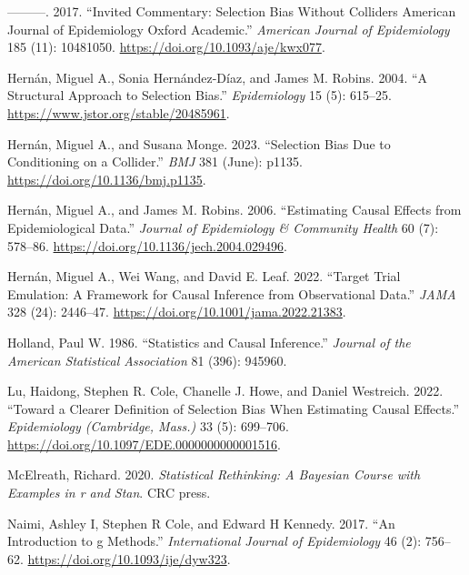 \documentclass[
  singlecolumn]{report}
\newlength{\cslhangindent}
\newlength{\cslentryspacingunit} %
\newenvironment{CSLReferences}[2] %
 {%
  \setlength{\parindent}{0pt}
  \ifodd #1
  \let\oldpar\par
  \def\par{\hangindent=\cslhangindent\oldpar}
  \fi
  \setlength{\parskip}{#2\cslentryspacingunit}
 }%
 {}
\begin{document}
\begin{CSLReferences}{1}{0}
\leavevmode{}%
---------. 2017. {``Invited Commentary: Selection Bias Without Colliders
\textbar{} American Journal of Epidemiology \textbar{} Oxford
Academic.''} \emph{American Journal of Epidemiology} 185 (11): 10481050.
\url{https://doi.org/10.1093/aje/kwx077}.

\leavevmode{}%
Hernán, Miguel A., Sonia Hernández-Díaz, and James M. Robins. 2004. {``A
Structural Approach to Selection Bias.''} \emph{Epidemiology} 15 (5):
615--25. \url{https://www.jstor.org/stable/20485961}.

\leavevmode{}%
Hernán, Miguel A., and Susana Monge. 2023. {``Selection Bias Due to
Conditioning on a Collider.''} \emph{BMJ} 381 (June): p1135.
\url{https://doi.org/10.1136/bmj.p1135}.

\leavevmode{}%
Hernán, Miguel A., and James M. Robins. 2006. {``Estimating Causal
Effects from Epidemiological Data.''} \emph{Journal of Epidemiology \&
Community Health} 60 (7): 578--86.
\url{https://doi.org/10.1136/jech.2004.029496}.

\leavevmode{}%
Hernán, Miguel A., Wei Wang, and David E. Leaf. 2022. {``Target Trial
Emulation: A Framework for Causal Inference from Observational Data.''}
\emph{JAMA} 328 (24): 2446--47.
\url{https://doi.org/10.1001/jama.2022.21383}.

\leavevmode{}%
Holland, Paul W. 1986. {``Statistics and Causal Inference.''}
\emph{Journal of the American Statistical Association} 81 (396): 945960.

\leavevmode{}%
Lu, Haidong, Stephen R. Cole, Chanelle J. Howe, and Daniel Westreich.
2022. {``Toward a Clearer Definition of Selection Bias When Estimating
Causal Effects.''} \emph{Epidemiology (Cambridge, Mass.)} 33 (5):
699--706. \url{https://doi.org/10.1097/EDE.0000000000001516}.

\leavevmode{}%
McElreath, Richard. 2020. \emph{Statistical Rethinking: A Bayesian
Course with Examples in r and Stan}. CRC press.

\leavevmode{}%
Naimi, Ashley I, Stephen R Cole, and Edward H Kennedy. 2017. {``An
Introduction to g Methods.''} \emph{International Journal of
Epidemiology} 46 (2): 756--62. \url{https://doi.org/10.1093/ije/dyw323}.


\end{CSLReferences}
\end{document}
